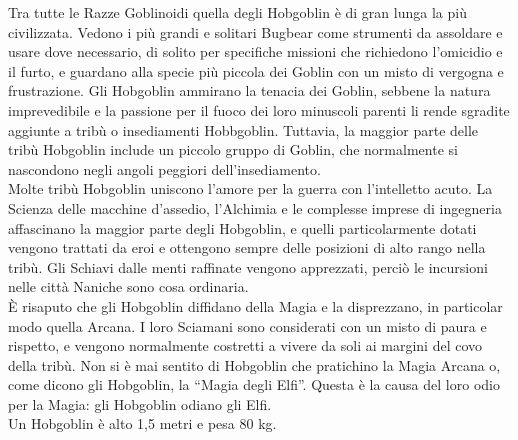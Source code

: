\begin{multicols}{2}
Tra tutte le Razze Goblinoidi quella degli Hobgoblin è di gran lunga la più civilizzata.
Vedono i più grandi e solitari Bugbear come strumenti da assoldare e usare dove necessario, di solito per specifiche missioni che richiedono l’omicidio e il furto, e guardano alla specie più piccola dei Goblin con un misto di vergogna e frustrazione. Gli Hobgoblin ammirano la tenacia dei Goblin, sebbene la natura imprevedibile e la passione per il fuoco dei loro minuscoli parenti li rende sgradite aggiunte a tribù o insediamenti Hobbgoblin. Tuttavia, la maggior parte delle tribù Hobgoblin include un piccolo gruppo di Goblin, che normalmente si nascondono negli angoli peggiori dell’insediamento.\\
Molte tribù Hobgoblin uniscono l’amore per la guerra con l’intelletto acuto. La Scienza delle macchine d'assedio, l’Alchimia e le complesse imprese di ingegneria affascinano la maggior parte degli Hobgoblin, e quelli particolarmente dotati vengono trattati da eroi e ottengono sempre delle posizioni di alto rango nella tribù. Gli Schiavi dalle menti raffinate vengono apprezzati, perciò le incursioni nelle città Naniche sono cosa ordinaria.\\
È risaputo che gli Hobgoblin diffidano della Magia e la disprezzano, in particolar modo quella Arcana. I loro Sciamani sono considerati con un misto di paura e rispetto, e vengono normalmente costretti a vivere da soli ai margini del covo della tribù. Non si è mai sentito di Hobgoblin che pratichino la Magia Arcana o, come dicono gli Hobgoblin, la “Magia degli Elfi”. Questa è la causa del loro odio per la Magia: gli Hobgoblin odiano gli Elfi.\\
Un Hobgoblin è alto 1,5 metri e pesa 80 kg.\\



\end{multicols}
